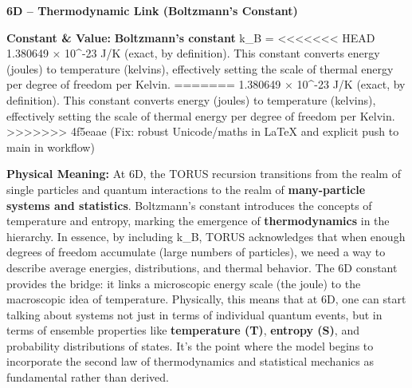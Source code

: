 \documentclass[]{article}
\begin{document}
\textbf{6D -- Thermodynamic Link (Boltzmann's Constant)}

\textbf{Constant \& Value:} \textbf{Boltzmann's constant} k\_B =
<<<<<<< HEAD
1.380649 × 10\^{}-23 J/K (exact, by definition)\hspace{0pt}. This
constant converts energy (joules) to temperature (kelvins), effectively
setting the scale of thermal energy per degree of freedom per Kelvin.
=======
1.380649 × 10\^{}-23 J/K (exact, by definition)​. This constant converts
energy (joules) to temperature (kelvins), effectively setting the scale
of thermal energy per degree of freedom per Kelvin.
>>>>>>> 4f5eaae (Fix: robust Unicode/maths in LaTeX and explicit push to main in workflow)

\textbf{Physical Meaning:} At 6D, the TORUS recursion transitions from
the realm of single particles and quantum interactions to the realm of
\textbf{many-particle systems and statistics}. Boltzmann's constant
introduces the concepts of temperature and entropy, marking the
emergence of \textbf{thermodynamics} in the hierarchy​. In essence, by
including k\_B, TORUS acknowledges that when enough degrees of freedom
accumulate (large numbers of particles), we need a way to describe
average energies, distributions, and thermal behavior. The 6D constant
provides the bridge: it links a microscopic energy scale (the joule) to
the macroscopic idea of temperature. Physically, this means that at 6D,
one can start talking about systems not just in terms of individual
quantum events, but in terms of ensemble properties like
\textbf{temperature (T)}, \textbf{entropy (S)}, and probability
distributions of states. It's the point where the model begins to
incorporate the second law of thermodynamics and statistical mechanics
as fundamental rather than derived.
\end{document}
